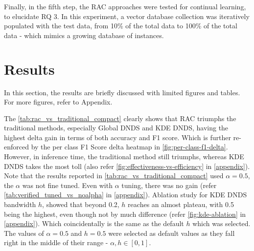 \documentclass{article}
\begin{document}
Finally, in the fifth step, the RAC approaches were tested for continual learning, to elucidate RQ 3. In this experiment, a vector database collection was iteratively populated with the test data, from 10\% of the total data to 100\% of the total data - which mimics a growing database of instances.   

\section{Results}
\label{sec:results}

\begin{table}[!htbp]
\centering
{}
\caption{Comparison of RAC variants against the traditional baseline}
\label{tab:rac_vs_traditional_compact}
\end{table}

In this section, the results are briefly discussed with limited figures and tables. For more figures, refer to Appendix.

The \autoref{tab:rac_vs_traditional_compact} clearly shows that RAC triumphs the traditional methods, especially Global DNDS and KDE DNDS, having the highest delta gain in terms of both accuracy and F1 score. Which is further re-enforced by the per class F1 Score delta heatmap in \autoref{fig:per-class-f1-delta}. However, in inference time, the traditional method still triumphs, whereas KDE DNDS takes the most toll (also refer \autoref{fig:effectiveness-vs-efficiency} in \autoref{appendix}). Note that the results reported in \autoref{tab:rac_vs_traditional_compact} used $\alpha = 0.5$, the $\alpha$ was not fine tuned. Even with $\alpha$ tuning, there was no gain (refer \autoref{tab:verified_tuned_vs_noalpha} in \autoref{appendix}). Ablation study for KDE DNDS bandwidth $h$, showed that beyond 0.2, $h$ reaches an almost plateau, with 0.5 being the highest, even though not by much difference (refer \autoref{fig:kde-ablation} in \autoref{appendix}). Which coincidentally is the same as the default $h$ which was selected. The values of $\alpha = 0.5$ and $h = 0.5$ were selected as default values as they fall right in the middle of their range - $ \alpha, h \in [0, 1]$.
\end{document}
